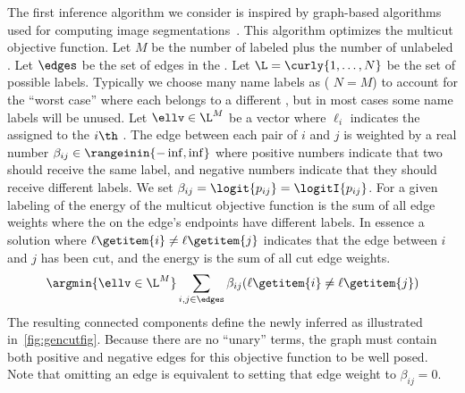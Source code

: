             \newcommand{\nAnnots}{M}
            \newcommand{\nNames}{N}
            The first inference algorithm we consider is inspired by
              graph-based algorithms used for computing image
              segmentations~\cite{kappes_globally_2011,
              kappes_higher_order_2016}.
            This algorithm optimizes the multicut objective function.
            Let $\nAnnots$ be the number of labeled plus the number of
              unlabeled \annots{}.
            Let $\edges$ be the set of edges in the \idengraph{}.
            Let $\L = \curly{1, \ldots, \nNames}$ be the set of possible
              \name{} labels.
            Typically we choose many name labels as \annots{} (\ie{} $N=M$) to
              account for the ``worst case'' where each \annot{} belongs to a
              different \name{}, but in most cases some name labels will be
              unused.
            Let $\ellv \in \L^{\nAnnots}$ be a vector where $\ell_i$ indicates
              the \name{} assigned to the $i\th$ \annot{}.
            The edge between each pair of \annots{} $i$ and $j$ is weighted by
              a real number $\beta_{ij} \in \rangeinin{-\inf, \inf}$ where
              positive numbers indicate that two \annots{} should receive the
              same \name{} label, and negative numbers indicate that they should
              receive different labels.
            We set $\beta_{ij} = \logit{p_{ij}} = \logitI{p_{ij}}$.
            For a given labeling of \annots{} the energy of the multicut
              objective function is the sum of all edge weights where the
              \annots{} on the edge's endpoints have different labels.
            In essence a solution where $\ell\getitem{i} \neq \ell\getitem{j}$
              indicates that the edge between \annots{} $i$ and $j$ has been
              cut, and the energy is the sum of all cut edge weights.
            \begin{equation}\label{eqn:cutobjective}
                \argmin{\ellv \in \L^{M}}
                \sum_{i,j \in \edges}
                    \beta_{ij} (\ell\getitem{i} \neq \ell\getitem{j})
            \end{equation}
            The resulting connected components define the newly inferred
              \names{} as illustrated in~\cref{fig:gencutfig}.
            Because there are no ``unary'' terms, the graph must contain both
              positive and negative edges for this objective function to be well
              posed.
            Note that omitting an edge is equivalent to setting that edge
              weight to $\beta_{ij}=0$.

